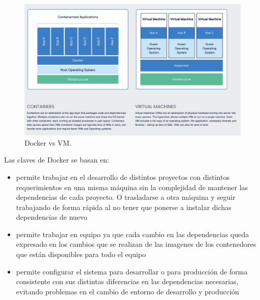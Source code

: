 \begin{figure}[H]
    \centering
    \includegraphics[height=0.3\textheight]{./part/Proyecto_ejecutivo/memoria_descriptiva/prestaciones/docker/img/dockerVsVM}
    \caption{Docker vs VM.\cite{docker}}\label{fig:Docker vs VM}
\end{figure}

Las claves de Docker se basan en:
\begin{itemize}
    \item permite trabajar en el desarrollo de distintos proyectos con distintos requerimientos en una misma máquina sin la complejidad de mantener las dependencias de cada proyecto. O trasladarse a otra máquina y seguir trabajando de forma rápida al no tener que ponerse a instalar dichas dependencias de nuevo
    \item permite trabajar en equipo ya que cada cambio en las dependencias queda expresado en los cambios que se realizan de las imagenes de los contenedores que están disponibles para todo el equipo
    \item permite configurar el sistema para desarrollar o para producción de forma consistente con sus distintas diferencias en las dependencias necesarias, evitando problemas en el cambio de entorno de desarrollo y producción
\end{itemize}